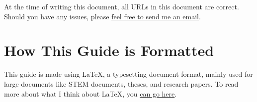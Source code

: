 At the time of writing this document, all URLs in this document are correct.
Should you have any issues, please
\underline{\href{mailto:HusseinEsmailContact@gmail.com}{feel free to send me an
email}}.

\section{How This Guide is Formatted}
This guide is made using \LaTeX{}, a typesetting document format, mainly used
for large documents like STEM documents, theses, and research papers. To read
more about what I think about \LaTeX{}, you
\href{https://husseinesmail.xyz/articles/is-latex-better.html}{can go here}.


\begin{comment}
\section{Lecture NUM: DATE}
\begin{itemize*}
    \item NOTES HERE
\end{itemize*}
\end{comment}

\begin{comment}
\section{Tutorial NUM: DATE}
\begin{itemize*}
    \item NOTES HERE
\end{itemize*}
\end{comment}

\begin{comment}
\section{Lab NUM: DATE}
\begin{itemize*}
    \item NOTES HERE
\end{itemize*}
\end{comment}

\begin{comment}
	TODO commands (using the todonotes package):
	\TODO{}			-> Normal
	\TODOimg{}		-> Insert image
	\TODOcontent{}	-> Insert more content here
	\TODOfig{}		-> Insert figure
\end{comment}
